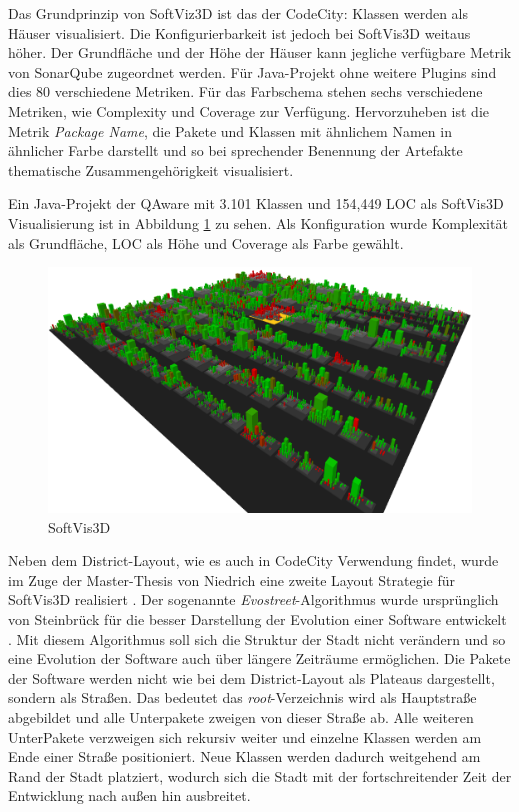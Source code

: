 Das Grundprinzip von SoftViz3D ist das der CodeCity: Klassen werden als Häuser visualisiert. Die Konfigurierbarkeit ist jedoch bei SoftVis3D weitaus höher. Der Grundfläche und der Höhe der Häuser kann jegliche verfügbare Metrik von SonarQube zugeordnet werden. Für Java-Projekt ohne weitere Plugins sind dies 80 verschiedene Metriken. Für das Farbschema stehen sechs verschiedene Metriken, wie Complexity und Coverage zur Verfügung. Hervorzuheben ist die Metrik \textit{Package Name}, die Pakete und Klassen mit ähnlichem Namen in ähnlicher Farbe darstellt und so bei sprechender Benennung der Artefakte thematische Zusammengehörigkeit visualisiert.

Ein Java-Projekt der QAware mit 3.101 Klassen und 154,449 LOC als SoftVis3D Visualisierung ist in Abbildung \ref{fig:softvis3d} zu sehen. Als Konfiguration wurde Komplexität als Grundfläche, LOC als Höhe und Coverage als Farbe gewählt.

\begin{figure}[htbp]
	\centering
	\includegraphics[width=\linewidth]{figures/softvis3d}
	\caption{SoftVis3D} \label{fig:softvis3d}
\end{figure}

Neben dem District-Layout, wie es auch in CodeCity Verwendung findet, wurde im Zuge der Master-Thesis von Niedrich eine zweite Layout Strategie für SoftVis3D realisiert \cite{niedrich2016integration}. Der sogenannte \textit{Evostreet}-Algorithmus wurde ursprünglich von Steinbrück für die besser Darstellung der Evolution einer Software entwickelt \cite{steinbruckner2013consistent}. Mit diesem Algorithmus soll sich die Struktur der Stadt nicht verändern und so eine Evolution der Software auch über längere Zeiträume ermöglichen. Die Pakete der Software werden nicht wie bei dem District-Layout als Plateaus dargestellt, sondern als Straßen. Das bedeutet das \textit{root}-Verzeichnis wird als Hauptstraße abgebildet und alle Unterpakete zweigen von dieser Straße ab. Alle weiteren UnterPakete verzweigen sich rekursiv weiter und einzelne Klassen werden am Ende einer Straße positioniert. Neue Klassen werden dadurch weitgehend am Rand der Stadt platziert, wodurch sich die Stadt mit der fortschreitender Zeit der Entwicklung nach außen hin ausbreitet.

